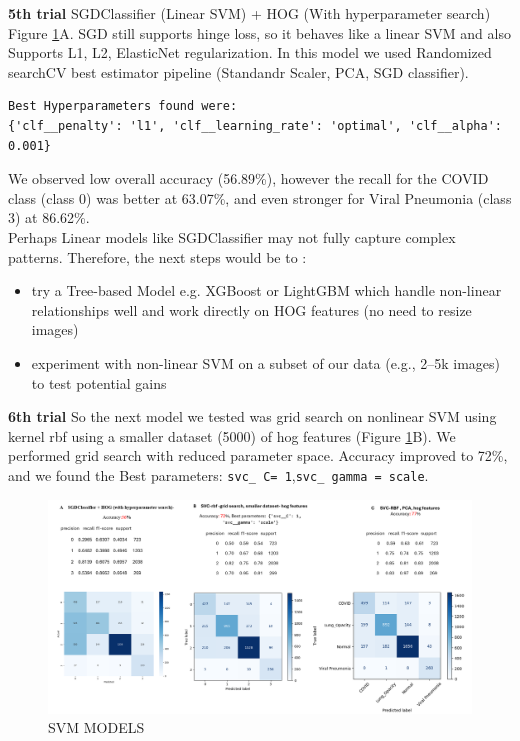 \documentclass{article}
\begin{document}
\textbf{5th trial }SGDClassifier (Linear SVM) + HOG (With hyperparameter search) Figure \ref{fig:SVM_MODELS}A. SGD still supports hinge loss, so it behaves like a linear SVM and also Supports L1, L2, ElasticNet regularization. In this model we used Randomized searchCV best estimator pipeline (Standandr Scaler, PCA, SGD classifier). \begin{verbatim}
Best Hyperparameters found were:
{'clf__penalty': 'l1', 'clf__learning_rate': 'optimal', 'clf__alpha': 0.001}
\end{verbatim}
We observed low overall accuracy (56.89\%), however the recall for the COVID class (class 0) was better at 63.07\%, and even stronger for Viral Pneumonia (class 3) at 86.62\%.\\
Perhaps Linear models like SGDClassifier may not fully capture complex patterns.
Therefore, the next steps would be to :
\begin{itemize}
    \item try a Tree-based Model e.g. XGBoost or LightGBM which handle non-linear relationships well and work directly on HOG features (no need to resize images)
    \item experiment with non-linear SVM on a subset of our data (e.g., 2–5k images) to test potential gains
\end{itemize}
\textbf{6th trial } So the next model we tested was grid search on nonlinear SVM using kernel rbf using a smaller dataset (5000) of hog features (Figure \ref{fig:SVM_MODELS}B). We performed grid search with reduced parameter space.  Accuracy improved to 72\%, and we found the Best parameters: \texttt{svc\_ C= 1},\texttt {svc\_ gamma = scale}.
\\
\begin{figure}[htb!] %
    \centering
    \includegraphics[width=1.0\linewidth]{svm ABC.png}
    \caption{SVM MODELS}
    \label{fig:SVM_MODELS}
\end{figure}
\end{document}
